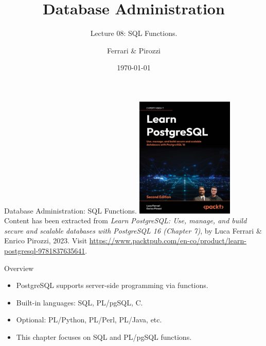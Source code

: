 \documentclass[aspectratio=169]{beamer}
\title[SQL Functions]{Database Administration}
\subtitle{Lecture 08: SQL Functions.}
\author{Ferrari \& Pirozzi}
\date{\today}
\begin{document}
\frame{\titlepage}

\begin{frame}{Database Administration: SQL Functions.}
    \centering
    \includegraphics[width=0.35\textwidth]{figures/book_cover}\\
    \vspace{2mm}
    {
        \footnotesize
        Content has been extracted from \textit{Learn PostgreSQL: Use, manage, and build secure and scalable databases with PostgreSQL 16 (Chapter 7)}, by Luca Ferrari \& Enrico Pirozzi, 2023.  Visit \url{https://www.packtpub.com/en-co/product/learn-postgresql-9781837635641}.
    }
\end{frame}

\begin{frame}{Overview}
  \begin{itemize}
      \item PostgreSQL supports server-side programming via functions.
      \item Built-in languages: SQL, PL/pgSQL, C.
      \item Optional: PL/Python, PL/Perl, PL/Java, etc.
      \item This chapter focuses on SQL and PL/pgSQL functions.
  \end{itemize}
\end{frame}

\lstset{basicstyle=\footnotesize,style=myCustomSQLStyle}

\end{document}
